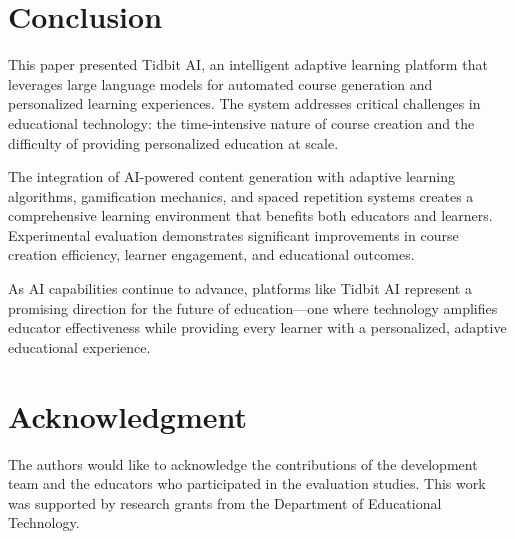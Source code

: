 \documentclass[conference]{IEEEtran}
\begin{document}
\section{Conclusion}

This paper presented Tidbit AI, an intelligent adaptive learning platform that leverages large language models for automated course generation and personalized learning experiences. The system addresses critical challenges in educational technology: the time-intensive nature of course creation and the difficulty of providing personalized education at scale.

The integration of AI-powered content generation with adaptive learning algorithms, gamification mechanics, and spaced repetition systems creates a comprehensive learning environment that benefits both educators and learners. Experimental evaluation demonstrates significant improvements in course creation efficiency, learner engagement, and educational outcomes.

As AI capabilities continue to advance, platforms like Tidbit AI represent a promising direction for the future of education---one where technology amplifies educator effectiveness while providing every learner with a personalized, adaptive educational experience.

\section*{Acknowledgment}

The authors would like to acknowledge the contributions of the development team and the educators who participated in the evaluation studies. This work was supported by research grants from the Department of Educational Technology.
\end{document}
